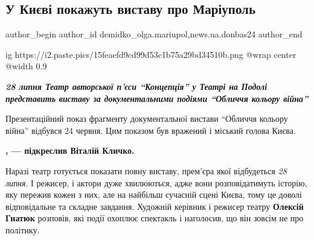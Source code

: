  
 
 
 
 
 
\subsection{У Києві покажуть виставу про Маріуполь}
\label{sec:20_07_2022.stz.news.ua.donbas24.1.u_kyevi_pokazhut_vystavu_pro_mariupol}
 
\ifcmt
 author_begin
   author_id demidko_olga.mariupol,news.ua.donbas24
 author_end
\fi

\ifcmt
  ig https://i2.paste.pics/15feaefd9cd99d53c1b75a29bd34510b.png
  @wrap center
  @width 0.9
\fi

\begin{center}
\Large\em\bfseries\color{blue}
28 липня Театр авторської п'єси \enquote{Концепція} у Театрі на Подолі представить
виставу за документальними подіями \enquote{Обличчя кольору війна}
\end{center}

Презентаційний показ фрагменту документальної вистави \enquote{Обличчя кольору війна}
відбувся 24 червня. Цим показом був вражений і міський голова Києва. 

\begin{leftbar}
	\begingroup
		\bfseries
{}, — підкреслив Віталій Кличко.
	\endgroup
\end{leftbar}


Наразі театр готується показати повну виставу, прем'єра якої відбудеться \emph{28
липня}. І режисер, і актори дуже хвилюються, адже вони розповідатимуть історію,
яку пережив кожен з них, але на найбільш сучасній сцені Києва, тому це доволі
відповідальне та складне завдання. Художній керівник і режисер театру \textbf{Олексій
Гнатюк} розповів, які події охоплює спектакль і наголосив, що він зовсім не про
політику.

